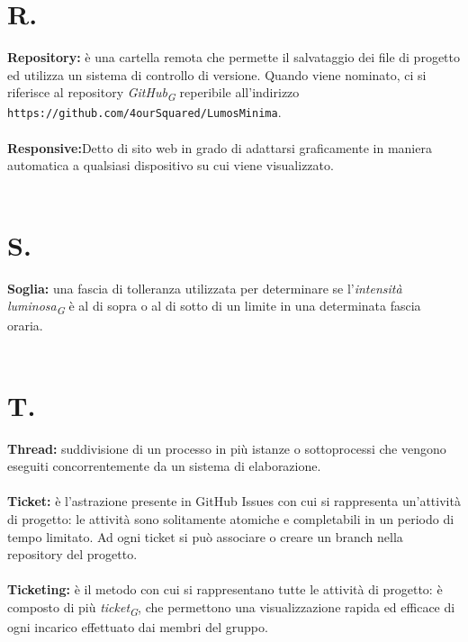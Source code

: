 \documentclass[a4paper, 12pt]{article}
\begin{document}
\newpage
\section*{R.}
\textbf{Repository:} è una cartella remota che permette il salvataggio dei file
di progetto ed utilizza un sistema di controllo di versione. Quando
viene nominato, ci si riferisce al repository \textit{GitHub\textsubscript{G}} reperibile all’indirizzo \texttt{https://github.com/4ourSquared/LumosMinima}.  \\ \\
\textbf{Responsive:}Detto di sito web in grado di adattarsi graficamente in maniera automatica a qualsiasi dispositivo su cui viene visualizzato. \\ \\

\newpage
\section*{S.}
\textbf{Soglia:} una fascia di tolleranza utilizzata per determinare se l'\textit{intensità luminosa\textsubscript{G}} è al di sopra o al di sotto di un limite in una determinata fascia oraria. \\ \\

\newpage
\section*{T.}
\textbf{Thread:} suddivisione di un processo in più istanze o sottoprocessi che vengono eseguiti concorrentemente da un sistema di elaborazione. \\ \\
\textbf{Ticket:} è l'astrazione presente in GitHub Issues con cui si rappresenta
un'attività di progetto: le attività sono solitamente atomiche e completabili in
un periodo di tempo limitato. Ad ogni ticket si può associare o creare un branch
nella repository del progetto.\\ \\
\textbf{Ticketing:} è il metodo con cui si rappresentano tutte le attività di
progetto: è composto di più \textit{ticket\textsubscript{G}}, che permettono una visualizzazione rapida ed
efficace di ogni incarico effettuato dai membri del gruppo. \\ \\
\newpage
\end{document}
